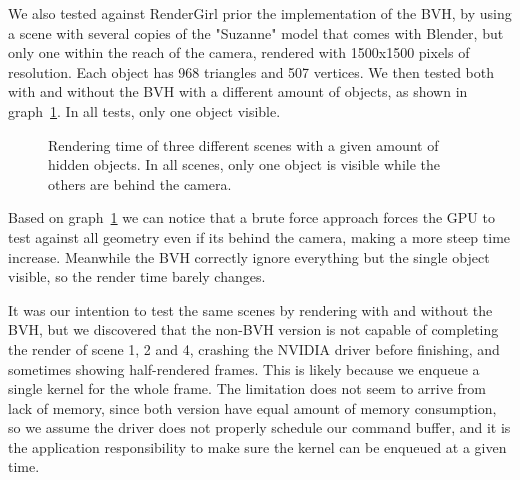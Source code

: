 \documentclass{vgtc}
\begin{document}
We also tested against RenderGirl prior the implementation of the BVH,
by using a scene with several copies of the "Suzanne" model that comes
with Blender, but only one within the reach of the camera, rendered
with 1500x1500 pixels of resolution. Each object has 968 triangles and
507 vertices. We then tested both with and without the BVH with a
different amount of objects, as shown in
graph~\ref{fig:bvh-no-bvh-results}. In all tests, only one object
visible.

\begin{figure}
\centering
{}
\caption{Rendering time of three different scenes with a given amount
  of hidden objects. In all scenes, only one object is visible while
  the others are behind the camera.}
\label{fig:bvh-no-bvh-results}
\end{figure}

Based on graph~\ref{fig:bvh-no-bvh-results} we can notice that a brute
force approach forces the GPU to test against all geometry even if its
behind the camera, making a more steep time increase. Meanwhile the
BVH correctly ignore everything but the single object visible, so the
render time barely changes.

It was our intention to test the same scenes by rendering with and
without the BVH, but we discovered that the non-BVH version is not
capable of completing the render of scene 1, 2 and 4, crashing the
NVIDIA driver before finishing, and sometimes showing half-rendered
frames. This is likely because we enqueue a single kernel for the
whole frame. The limitation does not seem to arrive from lack of
memory, since both version have equal amount of memory consumption, so
we assume the driver does not properly schedule our command buffer,
and it is the application responsibility to make sure the kernel can
be enqueued at a given time.
\end{document}
